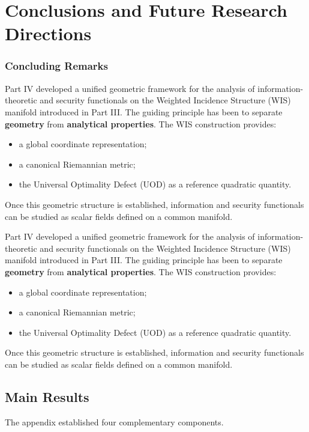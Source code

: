 \chapter[Conclusions]{Conclusions and Future Research Directions}

\subsection{Concluding Remarks}
Part IV developed a unified geometric framework for the analysis of
information-theoretic and security functionals on the Weighted Incidence
Structure (WIS) manifold introduced in Part III.
The guiding principle has been to separate \textbf{geometry} from
\textbf{analytical properties}.
The WIS construction provides:
\begin{itemize}
\item a global coordinate representation;
\item a canonical Riemannian metric;
\item the Universal Optimality Defect (UOD) as a reference quadratic quantity.
\end{itemize}
Once this geometric structure is established, information and security
functionals can be studied as scalar fields defined on a common
manifold.



Part IV developed a unified geometric framework for the analysis of
information-theoretic and security functionals on the Weighted Incidence
Structure (WIS) manifold introduced in Part III.
The guiding principle has been to separate \textbf{geometry} from
\textbf{analytical properties}.
The WIS construction provides:
\begin{itemize}
\item a global coordinate representation;
\item a canonical Riemannian metric;
\item the Universal Optimality Defect (UOD) as a reference quadratic quantity.
\end{itemize}
Once this geometric structure is established, information and security
functionals can be studied as scalar fields defined on a common
manifold.

\section{Main Results}

The appendix established four complementary components.

